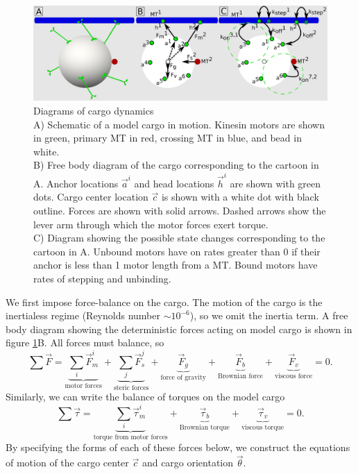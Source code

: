 \begin{figure}
\centering
\includegraphics[width=6.5in]{appendix1/diagrams.eps}
\caption[Diagrams of simulated cargo dynamics]{Diagrams of cargo dynamics \\
A) Schematic of a model cargo in motion. Kinesin motors are shown in green, primary MT in red, crossing MT in blue, and bead in white. \\
B) Free body diagram of the cargo corresponding to the cartoon in A. Anchor locations $\vec{a}^i$ and head locations $\vec{h}^i$ are shown with green dots. Cargo center location $\vec{c}$ is shown with a white dot with black outline. Forces are shown with solid arrows. Dashed arrows show the lever arm through which the motor forces exert torque. \\
C) Diagram showing the possible state changes corresponding to the cartoon in A. Unbound motors have on rates greater than 0 if their anchor is less than 1 motor length from a MT. Bound motors have rates of stepping and unbinding.
} \label{fig:FBD}
\end{figure}

We first impose force-balance on the cargo. The motion of the cargo is the inertialess regime (Reynolds number $\sim 10^{-6}$), so we omit the inertia term. A free body diagram showing the deterministic forces acting on model cargo is shown in figure \ref{fig:FBD}B. All forces must balance, so
\begin{equation} \label{eq:forcebalance}
\sum \vec{F} = \underbrace{\sum_i \vec{F}_m^i}_{\text{motor forces}} + \underbrace{\sum_j \vec{F}_s^j}_{\text{steric forces}} + \underbrace{\vec{F}_g}_{\text{force of gravity}} + \underbrace{\vec{F}_b}_{\text{Brownian force}} + \underbrace{\vec{F}_v}_{\text{viscous force}} = 0.
\end{equation}
Similarly, we can write the balance of torques on the model cargo
\begin{equation} \label{eq:torquebalance}
\sum \vec{\tau} = \underbrace{\sum_i \vec{\tau}_m^i}_{\text{torque from motor forces}} +\underbrace{\vec{\tau}_b}_{\text{Brownian torque}} + \underbrace{\vec{\tau}_v}_{\text{viscous torque}} = 0.
\end{equation}
By specifying the forms of each of these forces below, we construct the equations of motion of the cargo center $\vec{c}$ and cargo orientation $\vec{\theta}$.

